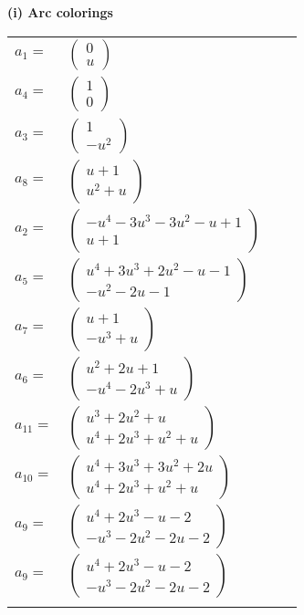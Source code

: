 \documentclass[1p]{elsarticle_modified}
\theoremstyle{definition}
\begin{document}
\flushleft \textbf{(i) Arc colorings}\\
\begin{tabular}{m{7pt} m{180pt} m{7pt} m{180pt} }
\flushright $a_{1}=$&$\begin{pmatrix}0\\u\end{pmatrix}$ \\
\flushright $a_{4}=$&$\begin{pmatrix}1\\0\end{pmatrix}$ \\
\flushright $a_{3}=$&$\begin{pmatrix}1\\- u^2\end{pmatrix}$ \\
\flushright $a_{8}=$&$\begin{pmatrix}u+1\\u^2+u\end{pmatrix}$ \\
\flushright $a_{2}=$&$\begin{pmatrix}- u^4-3 u^3-3 u^2- u+1\\u+1\end{pmatrix}$ \\
\flushright $a_{5}=$&$\begin{pmatrix}u^4+3 u^3+2 u^2- u-1\\- u^2-2 u-1\end{pmatrix}$ \\
\flushright $a_{7}=$&$\begin{pmatrix}u+1\\- u^3+u\end{pmatrix}$ \\
\flushright $a_{6}=$&$\begin{pmatrix}u^2+2 u+1\\- u^4-2 u^3+u\end{pmatrix}$ \\
\flushright $a_{11}=$&$\begin{pmatrix}u^3+2 u^2+u\\u^4+2 u^3+u^2+u\end{pmatrix}$ \\
\flushright $a_{10}=$&$\begin{pmatrix}u^4+3 u^3+3 u^2+2 u\\u^4+2 u^3+u^2+u\end{pmatrix}$ \\
\flushright $a_{9}=$&$\begin{pmatrix}u^4+2 u^3- u-2\\- u^3-2 u^2-2 u-2\end{pmatrix}$\\ \flushright $a_{9}=$&$\begin{pmatrix}u^4+2 u^3- u-2\\- u^3-2 u^2-2 u-2\end{pmatrix}$\\&\end{tabular}
\end{document}
